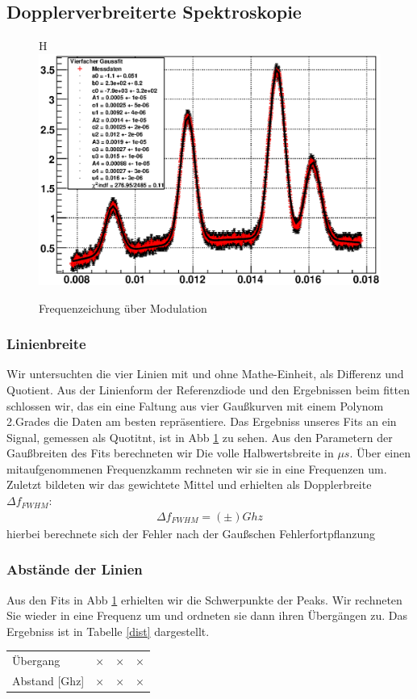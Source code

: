 \documentclass[12pt]{article}
\begin{document}
\subsection{Dopplerverbreiterte Spektroskopie}
\begin{figure}H
 \includegraphics[width=0.9\linewidth]{pictures/doppler.eps}
 \caption{Frequenzeichung über Modulation}
 \label{doppler}
\end{figure}
\subsubsection{Linienbreite}
Wir untersuchten die vier Linien mit und ohne Mathe-Einheit, als Differenz und Quotient. Aus der Linienform der Referenzdiode und den Ergebnissen beim fitten schlossen wir, das ein eine Faltung aus vier Gaußkurven mit einem Polynom 2.Grades die Daten am besten repräsentiere. Das Ergebniss unseres Fits an ein Signal, gemessen als Quotitnt, ist in Abb \ref{doppler} zu sehen. Aus den Parametern der Gaußbreiten des Fits berechneten wir Die volle Halbwertsbreite in $\mu s$. Über einen mitaufgenommenen Frequenzkamm rechneten wir sie in eine Frequenzen um. Zuletzt bildeten wir das gewichtete Ḿittel und erhielten als Dopplerbreite $\Delta f_{FWHM}$:
\begin{align*}
 \Delta f_{FWHM} = (\pm) Ghz 
\end{align*}
hierbei berechnete sich der Fehler nach der Gaußschen Fehlerfortpflanzung
\subsubsection{Abstände der Linien}
Aus den Fits in Abb \ref{doppler} erhielten wir die Schwerpunkte der Peaks. Wir rechneten Sie wieder in eine Frequenz um und ordneten sie dann ihren Übergängen zu. Das Ergebniss ist in Tabelle \ref{dist} dargestellt.
\begin{center}
\begin{tabular}{|l|lll|}
\label{dist}
\hline
Übergang & × & × & ×\\
Abstand [Ghz] & × & × & ×
\hline
\end{tabular}
\end{center}
\end{document}
